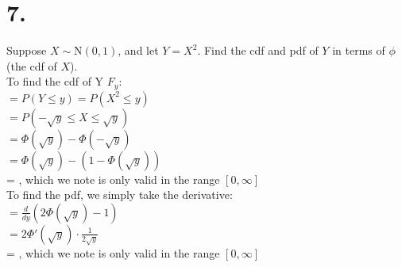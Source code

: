 \documentclass{article}
\begin{document}
\section*{7.}
{\Large 
Suppose $X\sim\mathrm N({0,1})$, and let $Y=X^{2}$. Find the cdf and pdf of $Y$ in terms of $\phi$ (the cdf of $X$). \\
To find the cdf of Y $F_y$: \\
$= P(Y \leq y) = P(X^2 \leq y)$ \\ 
$= P(-\sqrt{y} \leq X \leq \sqrt{y})$ \\
$ = \Phi(\sqrt{y}) - \Phi(-\sqrt{y})$ \\
$ = \Phi(\sqrt{y}) - (1 - \Phi(\sqrt{y}))$ \\
= , which we note is only valid in the range $[0, \infty]$ \\ 
To find the pdf, we simply take the derivative: \\ 
$ = \frac{d}{dy} (2\Phi(\sqrt{y}) - 1)$ \\ 
$ = 2\Phi'(\sqrt{y}) \cdot \frac{1}{2\sqrt{y}}$ \\ 
= , which we note is only valid in the range $[0, \infty]$

}
\end{document}
